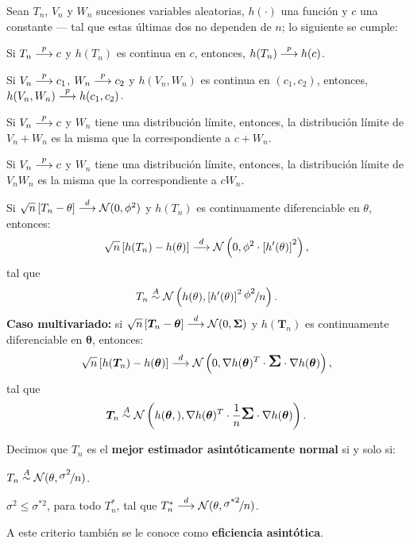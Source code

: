 \documentclass[8pt,a4paper]{extarticle}
\begin{document}
\begin{multicols}{3}
	\begin{boxtheo}[de Slutsky]
		Sean $T_n$, $V_n$ y $W_n$ sucesiones variables aleatorias, $h(\cdot)$ una función y $c$ una constante --- tal que estas últimas dos no dependen de $n$; lo siguiente se cumple:
		\begin{eqlist}
			\item Si $T_n \overset{p}{\longrightarrow} c$ y $h(T_n)$ es continua en $c$, entonces, $h(T_n) \overset{p}{\longrightarrow} h(c)$.
			\item Si $V_n \overset{p}{\longrightarrow} c_1$, $W_n \overset{p}{\longrightarrow} c_2$ y $h(V_n,W_n)$ es continua en $(c_1,c_2)$, entonces, $h(V_n,W_n) \overset{p}{\longrightarrow} h(c_1,c_2)$.
			\item Si $V_n \overset{p}{\longrightarrow} c$ y $W_n$ tiene una distribución límite, entonces, la distribución límite de $V_n + W_n$ es la misma que la correspondiente a $c + W_n$.
			\item Si $V_n \overset{p}{\longrightarrow} c$ y $W_n$ tiene una distribución límite, entonces, la distribución límite de $V_n W_n$ es la misma que la correspondiente a $c W_n$.
			\item Si $\sqrt{n}\left[ T_n - \theta \right] \overset{d}{\longrightarrow} \mathcal{N}(0, \phi^2)$ y $h(T_n)$ es continuamente diferenciable en $\theta$, entonces: \[\sqrt{n} \left[ h(T_n) - h(\theta) \right] \overset{d}{\longrightarrow} \mathcal{N}\left(0, \phi^2 \cdot \left[ h'(\theta) \right]^2 \right),\] tal que \[T_n \overset{A}{\sim} \mathcal{N} \left( h(\theta), \left[ h'(\theta) \right]^2 \nicefrac{\displaystyle \phi^2}{\displaystyle n} \right).\] \textbf{Caso multivariado:} si $\sqrt{n} \left[ {\bm T_n} - {\bm\theta} \right] \overset{d}{\longrightarrow} \mathcal{N}(0, {\bm \Sigma})$ y $h({\bm T_n})$ es continuamente diferenciable en ${\bm\theta}$, entonces: \[\sqrt{n} \left[ h({\bm T_n}) - h({\bm\theta}) \right] \overset{d}{\longrightarrow} \mathcal{N}\left(0, \nabla h({\bm\theta})^T \cdot \text{\Large $\bm \Sigma$} \cdot \nabla h({\bm\theta}) \right),\] tal que \[{\bm T_n} \overset{A}{\sim} \mathcal{N} \left( h({\bm \theta}, ), \nabla h({\bm\theta})^T \cdot \frac{1}{n} \text{\Large $\bm \Sigma$} \cdot \nabla h({\bm\theta}) \right) .\]
		\end{eqlist}
	\end{boxtheo}

	\begin{boxdef}
		Decimos que $T_n$ es el \textbf{mejor estimador asintóticamente normal} si y solo si:
		\begin{eqlist}
			\item $T_n \overset{A}{\sim} \mathcal{N}(\theta,\nicefrac{\displaystyle \sigma^2}{\displaystyle n})$.
			\item $\sigma^2 \leq \sigma^{*2}$, para todo $T^*_n$, tal que $T^*_n \overset{d}{\longrightarrow} \mathcal{N}(\theta,\nicefrac{\displaystyle \sigma^{*2}}{\displaystyle n})$.
		\end{eqlist}
		A este criterio también se le conoce como \textbf{eficiencia asintótica}.
	\end{boxdef}


\end{multicols}
\end{document}
